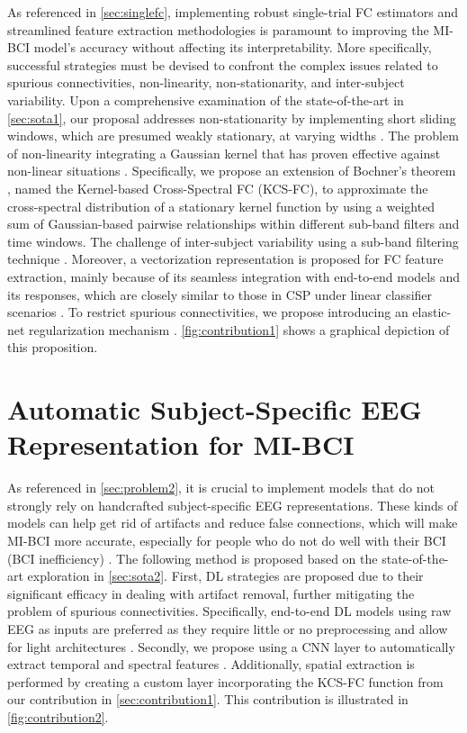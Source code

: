 As referenced in \cref{sec:singlefc}, implementing robust single-trial FC estimators and streamlined feature extraction methodologies is paramount to improving the MI-BCI model's accuracy without affecting its interpretability. More specifically, successful strategies must be devised to confront the complex issues related to spurious connectivities, non-linearity, non-stationarity, and inter-subject variability. Upon a comprehensive examination of the state-of-the-art in \cref{sec:sota1}, our proposal addresses non-stationarity by implementing short sliding windows, which are presumed weakly stationary, at varying widths \cite{gaur2021sliding}. The problem of non-linearity integrating a Gaussian kernel that has proven effective against non-linear situations \cite{gunawardena2023kernel}. Specifically, we propose an extension of Bochner's theorem \cite{bochner2020harmonic}, named the Kernel-based Cross-Spectral FC (KCS-FC),  to approximate the cross-spectral distribution of a stationary kernel function by using a weighted sum of Gaussian-based pairwise relationships within different sub-band filters and time windows. The challenge of inter-subject variability using a sub-band filtering technique \cite{mammone2023autoencoder}. Moreover, a vectorization representation is proposed for FC feature extraction, mainly because of its seamless integration with end-to-end models and its responses, which are closely similar to those in CSP under linear classifier scenarios \cite{meng2023rhythmic, zoumpourlis2022covmix}. To restrict spurious connectivities, we propose introducing an elastic-net regularization mechanism \cite{tay2023elastic}. \cref{fig:contribution1} shows a graphical depiction of this proposition.  


\section{Automatic Subject-Specific EEG Representation for MI-BCI}

As referenced in \cref{sec:problem2}, it is crucial to implement models that do not strongly rely on handcrafted subject-specific EEG representations. These kinds of models can help get rid of artifacts and reduce false connections, which will make MI-BCI more accurate, especially for people who do not do well with their BCI (BCI inefficiency) \cite{park2023improving}. The following method is proposed based on the state-of-the-art exploration in \cref{sec:sota2}. First, DL strategies are proposed due to their significant efficacy in dealing with artifact removal, further mitigating the problem of spurious connectivities\cite{altaheri2023deep, huang2023discrepancy, hassanpour2019novel}. Specifically, end-to-end DL models using raw EEG as inputs are preferred as they require little or no preprocessing and allow for light architectures \cite{dose2018end, amin2019deep}. Secondly, we propose using a CNN layer to automatically extract temporal and spectral features \cite{altaheri2023deep, craik2019deep, musallam2021electroencephalography, lawhern2018eegnet}. Additionally, spatial extraction is performed by creating a custom layer incorporating the KCS-FC function from our contribution in \cref{sec:contribution1}. This contribution is illustrated in \cref{fig:contribution2}.


